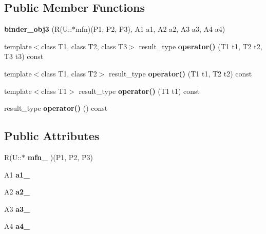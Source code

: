 \subsection*{Public Member Functions}
\begin{CompactItemize}
\item 
\textbf{binder\_\-obj3} (R(U::$\ast$mfn)(P1, P2, P3), A1 a1, A2 a2, A3 a3, A4 a4)\label{structam_1_1lambda_1_1binder__obj3_c5fcc482e43a36faf1939985c32a716d}

\item 
template$<$class T1, class T2, class T3$>$ result\_\-type \textbf{operator()} (T1 t1, T2 t2, T3 t3) const \label{structam_1_1lambda_1_1binder__obj3_64dacce5c3ea8d015b42cdbc903b0cb0}

\item 
template$<$class T1, class T2$>$ result\_\-type \textbf{operator()} (T1 t1, T2 t2) const\label{structam_1_1lambda_1_1binder__obj3_fd82b9f13adab9980950fa65218345a7}

\item 
template$<$class T1$>$ result\_\-type \textbf{operator()} (T1 t1) const \label{structam_1_1lambda_1_1binder__obj3_25fba29089b5f098cfc6497311c47f5f}

\item 
result\_\-type \textbf{operator()} () const\label{structam_1_1lambda_1_1binder__obj3_c6adcbfca05844b4e467a2f1facccdf8}

\end{CompactItemize}
\subsection*{Public Attributes}
\begin{CompactItemize}
\item 
R(U::$\ast$ \textbf{mfn\_\-} )(P1, P2, P3)\label{structam_1_1lambda_1_1binder__obj3_b7fb9cb1faa12f1791c64e3b65e6b83c}

\item 
A1 \textbf{a1\_\-}\label{structam_1_1lambda_1_1binder__obj3_cd739e72b4e47ce2c27a271b7cbe2541}

\item 
A2 \textbf{a2\_\-}\label{structam_1_1lambda_1_1binder__obj3_f504f1195118a5bd741922a683ba6bfb}

\item 
A3 \textbf{a3\_\-}\label{structam_1_1lambda_1_1binder__obj3_b625d13105628d14fa426aef1a52ae5b}

\item 
A4 \textbf{a4\_\-}\label{structam_1_1lambda_1_1binder__obj3_29397f2409045b66d1a46e77d3cab171}

\end{CompactItemize}


